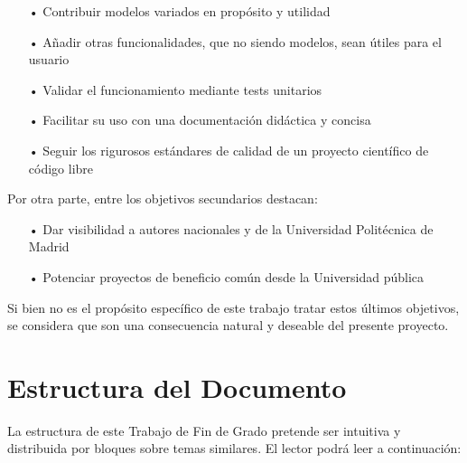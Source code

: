 \begin{itemize}

    \item[•] Contribuir modelos variados en propósito y utilidad

    \item[•] Añadir otras funcionalidades, que no siendo modelos, sean útiles para el usuario

    \item[•] Validar el funcionamiento mediante tests unitarios

    \item[•] Facilitar su uso con una documentación didáctica y concisa

    \item[•] Seguir los rigurosos estándares de calidad de un proyecto científico de código libre

\end{itemize}

Por otra parte, entre los objetivos secundarios destacan:

\begin{itemize}

    \item [•] Dar visibilidad a autores nacionales y de la Universidad Politécnica de Madrid
    
    \item [•] Potenciar proyectos de beneficio común desde la Universidad pública

\end{itemize}

Si bien no es el propósito específico de este trabajo tratar estos últimos objetivos, se considera que son una consecuencia natural y deseable del presente proyecto.


\section{Estructura del Documento} \label{sct:intro_estructura}

La estructura de este Trabajo de Fin de Grado pretende ser intuitiva y distribuida por bloques sobre temas similares. El lector podrá leer a continuación:

